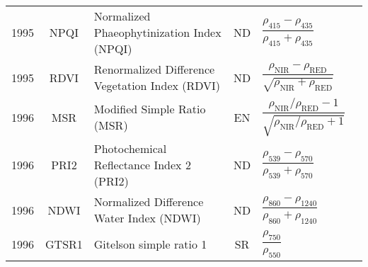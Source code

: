 \documentclass[10pt]{article}
\begin{document}
\begin{ThreePartTable}
\begin{longtable}{c c m{2.3in} c M{2.8in} M{1.5in}}
  1995 & NPQI    & Normalized Phaeophytinization Index (NPQI)                                     & ND & $\dfrac{\rho_{415}-\rho_{435}}{\rho_{415}+\rho_{435}}$                                                                                                                                                                                                                                  & \citet{Penuelas1995b}                               \\
  1995 & RDVI    & Renormalized Difference Vegetation Index (RDVI)                                & ND & $\dfrac{\rho_\text{NIR}-\rho_\text{RED}}{\sqrt{\rho_\text{NIR}+\rho_\text{RED}}}$                                                                                                                                                                                                       & \citet{Roujean1995}                                 \\
  1996 & MSR     & Modified Simple Ratio (MSR)                                                    & EN & $\dfrac{\rho_\text{NIR}/\rho_\text{RED}-1}{\sqrt{\rho_\text{NIR}/\rho_\text{RED}+1}}$                                                                                                                                                                                                   & \citet{Chen1996,Roujean1995}                        \\
  1996 & PRI2    & Photochemical Reflectance Index 2 (PRI2)                                       & ND & $\dfrac{\rho_{539}-\rho_{570}}{\rho_{539}+\rho_{570}}$                                                                                                                                                                                                                                  & \citet{Filella1996}                                 \\
  1996 & NDWI    & Normalized Difference Water Index (NDWI)                                       & ND & $\dfrac{\rho_{860}-\rho_{1240}}{\rho_{860}+\rho_{1240}}$                                                                                                                                                                                                                                & \citet{Gao1996}                                     \\
  1996 & GTSR1   & Gitelson simple ratio 1                                                        & SR & $\dfrac{\rho_{750}}{\rho_{550}}$                                                                                                                                                                                                                                                        & \citet{Gitelson1996b,Gitelson1997,Lichtenthaler1996}\\

\end{longtable}
\end{ThreePartTable}
\end{document}
